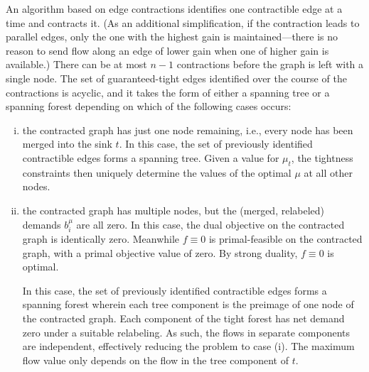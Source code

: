 \documentclass[11pt]{article}
\makeatletter
\let\comment\todo
\newcommand{\david}[1]{\comment[nolist,color=orange!40]{@david\\ #1}}
\theoremstyle{definition}
\theoremstyle{definition}
\theoremstyle{definition}
\newcommand{\biu}{b_{i}^{\mu}}
\renewcommand{\todo}[1]{\hl{TODO: #1}}
\makeatother
\begin{document}
	An algorithm based on edge contractions identifies one contractible
	edge at a time and contracts it. 
    (As an additional simplification, if the contraction leads to parallel edges,
	only the one with the highest gain is maintained---there is no reason to send
	flow along an edge of lower gain when one of higher gain is available.)
	There can be at most $n - 1$ contractions
	before the graph is left with a single node. The set of guaranteed-tight edges identified
	over the course of the contractions is acyclic, and it takes the form of
	either a spanning tree or a spanning forest depending on which of the following
	cases occurs:
	\begin{enumerate}[(i),itemsep=0mm]
	\item the contracted graph has just one node remaining, i.e., every node has been merged
	into the sink $t$. In this case, the set of previously identified
	contractible edges forms a spanning tree. Given a value for $\mu_t$, the tightness
	constraints then uniquely determine the values of the optimal $\mu$ at all other nodes.
	
	\item the contracted graph has multiple nodes, but the (merged, relabeled)
	demands $\biu$ are all zero. In this case, the dual objective on the contracted
	graph is identically zero. Meanwhile $f \equiv 0$ is primal-feasible on the contracted
	graph, with a primal objective value of zero. By strong duality, $f \equiv 0$ is optimal.
	
	In this case, the set of previously identified contractible edges
	forms a spanning forest wherein each tree component is the preimage of one node
	of the contracted graph.
	Each component of the tight forest has net demand zero under a suitable relabeling.
	As such, the flows in separate components are independent, effectively reducing
	the problem to case (i). The maximum flow value only depends on the flow in the
	tree component of $t$.
	\end{enumerate}
	
	
\end{document}
